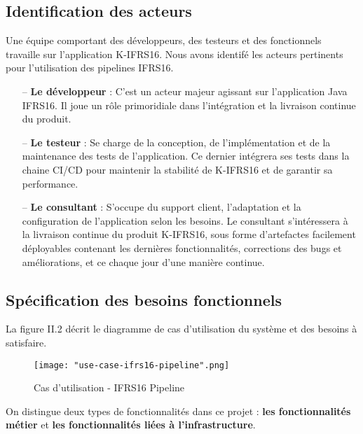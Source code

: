 \begin{spacing}{1.2}
\subsection{Identification des acteurs}
Une équipe comportant des développeurs, des testeurs et des fonctionnels travaille sur l'application K-IFRS16. Nous avons identifé les acteurs pertinents pour l'utilisation des pipelines IFRS16.  
\begin{itemize}
    \setlength\itemsep{0em}
    \item[--] \textbf{Le développeur} : C'est un acteur majeur agissant sur l'application Java IFRS16. Il joue un rôle primoridiale dans l'intégration et la livraison continue du produit. 
    \item[--] \textbf{Le testeur} : Se charge de la conception, de l'implémentation et de la maintenance des tests de l'application. Ce dernier intégrera ses tests dans la chaine CI/CD pour maintenir la stabilité de K-IFRS16 et de garantir sa performance.
    \item[--] \textbf{Le consultant} : S'occupe du support client, l'adaptation et la configuration de l'application selon les besoins. Le consultant s'intéressera à la livraison continue du produit K-IFRS16, sous forme d'artefactes facilement déployables contenant les dernières fonctionnalités, corrections des bugs et améliorations, et ce chaque jour d'une manière continue.   
\end{itemize}
\subsection{Spécification des besoins fonctionnels}
La figure II.2 décrit le diagramme de cas d’utilisation du système et des besoins à satisfaire.
\begin{figure}[!ht]\centering
\texttt{[image: "use-case-ifrs16-pipeline".png]}
\caption{Cas d'utilisation - IFRS16 Pipeline}
\label{fig:fig2}
\end{figure}
\FloatBarrier
On distingue deux types de fonctionnalités dans ce projet : \textbf{les fonctionnalités métier} et \textbf{les fonctionnalités liées à l'infrastructure}. 

\end{spacing}

